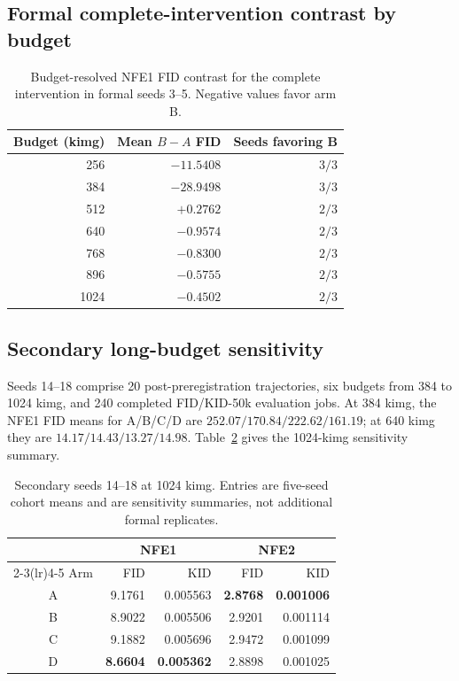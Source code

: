 \documentclass{article}
\begin{document}
\subsection{Formal complete-intervention contrast by budget}

\begin{table}[h]
  \caption{Budget-resolved NFE1 FID contrast for the complete intervention in
  formal seeds 3--5. Negative values favor arm B.}
  \label{tab:ba-curve}
  \centering
  \small
  \begin{tabular}{rrr}
    \toprule
    Budget (kimg) & Mean $B-A$ FID & Seeds favoring B \\
    \midrule
     256 & $-11.5408$ & $3/3$ \\
     384 & $-28.9498$ & $3/3$ \\
     512 & $ +0.2762$ & $2/3$ \\
     640 & $ -0.9574$ & $2/3$ \\
     768 & $ -0.8300$ & $2/3$ \\
     896 & $ -0.5755$ & $2/3$ \\
    1024 & $ -0.4502$ & $2/3$ \\
    \bottomrule
  \end{tabular}
\end{table}

\subsection{Secondary long-budget sensitivity}

Seeds 14--18 comprise 20 post-preregistration trajectories, six budgets from
384 to 1024 kimg, and 240 completed FID/KID-50k evaluation jobs. At 384 kimg,
the NFE1 FID means for A/B/C/D are $252.07/170.84/222.62/161.19$; at 640 kimg
they are $14.17/14.43/13.27/14.98$. Table~\ref{tab:secondary-1024} gives the
1024-kimg sensitivity summary.

\begin{table}[h]
  \caption{Secondary seeds 14--18 at 1024 kimg. Entries are five-seed cohort
  means and are sensitivity summaries, not additional formal replicates.}
  \label{tab:secondary-1024}
  \centering
  \small
  \begin{tabular}{crrrr}
    \toprule
    & \multicolumn{2}{c}{NFE1} & \multicolumn{2}{c}{NFE2} \\
    \cmidrule(lr){2-3}\cmidrule(lr){4-5}
    Arm & FID & KID & FID & KID \\
    \midrule
    A & 9.1761 & 0.005563 & \textbf{2.8768} & \textbf{0.001006} \\
    B & 8.9022 & 0.005506 & 2.9201 & 0.001114 \\
    C & 9.1882 & 0.005696 & 2.9472 & 0.001099 \\
    D & \textbf{8.6604} & \textbf{0.005362} & 2.8898 & 0.001025 \\
    \bottomrule
  \end{tabular}
\end{table}
\end{document}
